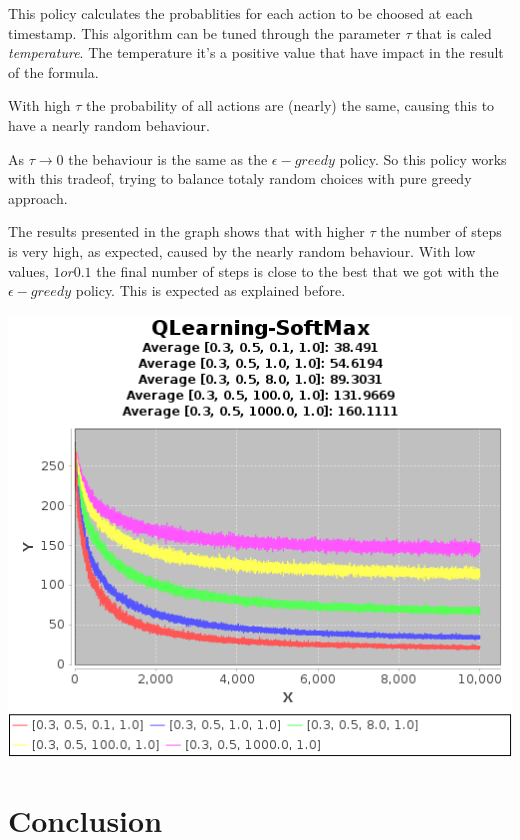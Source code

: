 \documentclass{article}
\begin{document}
This policy calculates the probablities for each action to be choosed at each
timestamp. This algorithm can be tuned through the parameter $\tau$ that is
caled \emph{temperature}.
The temperature it's a positive value that have impact in the result of the
formula.

With high $\tau$ the probability of all actions are (nearly) the same, causing
this to have a nearly random behaviour.

As $\tau \rightarrow 0$ the behaviour is the same as the $\epsilon-greedy$
policy.
So this policy works with this tradeof, trying to balance totaly random choices
with pure greedy approach.

The results presented in the graph shows that with higher $\tau$ the number of
steps is very high, as expected, caused by the nearly random behaviour. With low
values, $1 or 0.1$ the final number of steps is close to the best that we got
with the $\epsilon-greedy$ policy. This is expected as explained before.

\includegraphics[]{res/alpha_03_gamma_05_temp_01_to_1000_IV_1.png}

\section{Conclusion}
\end{document}
